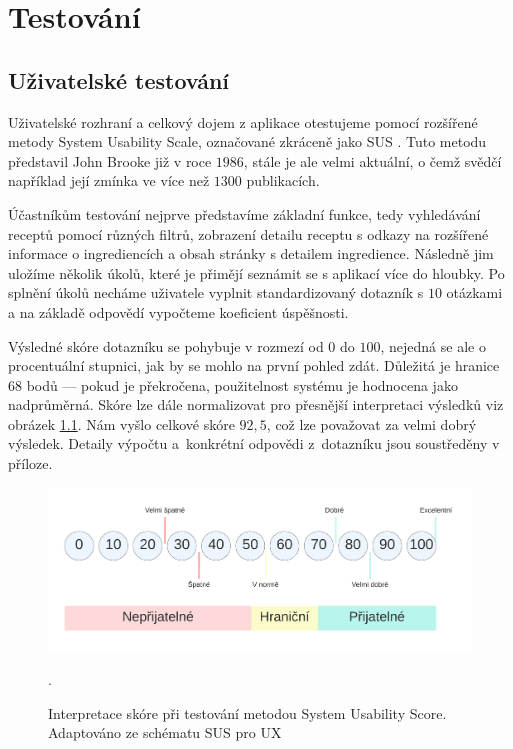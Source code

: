 
\chapter{Testování}

\section{Uživatelské testování}

Uživatelské rozhraní a celkový dojem z aplikace otestujeme pomocí rozšířené metody System Usability Scale, označované zkráceně jako SUS \citep{sus-test}. Tuto metodu představil John Brooke již v roce $1986$, stále je ale velmi aktuální, o čemž svědčí například její zmínka ve více než $1300$ publikacích.

Účastníkům testování nejprve představíme základní funkce, tedy vyhledávání receptů pomocí různých filtrů, zobrazení detailu receptu s odkazy na rozšířené informace o ingrediencích a obsah stránky s detailem ingredience. Následně jim uložíme několik úkolů, které je přimějí seznámit se s aplikací více do hloubky. Po splnění úkolů necháme uživatele vyplnit standardizovaný dotazník s $10$ otázkami a na základě odpovědí vypočteme koeficient úspěšnosti.

Výsledné skóre dotazníku se pohybuje v rozmezí od $0$ do $100$, nejedná se ale o procentuální stupnici, jak by se mohlo na první pohled zdát. Důležitá je hranice $68$ bodů --- pokud je překročena, použitelnost systému je hodnocena jako nadprůměrná. Skóre lze dále normalizovat pro přesnější interpretaci výsledků viz obrázek \ref{obr04:sus-score-system}. Nám vyšlo celkové skóre $92,5$, což lze považovat za velmi dobrý výsledek. Detaily výpočtu a~konkrétní odpovědi z~dotazníku jsou soustředěny v příloze.

\begin{figure}[h!]\centering
\includegraphics[width=140mm]{../img/sus-score-system}
\caption{Interpretace skóre při testování metodou System Usability Score. Adaptováno ze schématu SUS pro UX \citep{sus-adobe}}.
\label{obr04:sus-score-system}
\end{figure}

